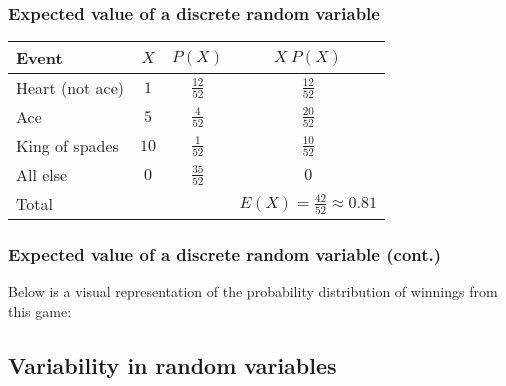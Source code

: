\documentclass[slidestop,compress,mathserif]{beamer}
\begin{document}

\begin{frame}
\frametitle{Expected value of a discrete random variable}


\pause

\begin{center}
\renewcommand{\arraystretch}{1.5}
\begin{tabular}{l | c | c | c }
Event		& $X$ 		& $P(X)$        		& $X ~ P(X)$ \\
\hline
Heart (not ace)	& $1$		& $\frac{12}{52}$	& $\frac{12}{52}$ \\
Ace			& $5$		& $\frac{4}{52}$	& $\frac{20}{52}$ \\	
King of spades	& $10$		& $\frac{1}{52}$	& $\frac{10}{52}$ \\	
All else		& $0$		& $\frac{35}{52}$	& $0$ \\
\hline
Total			&			&				& $E(X) = \frac{42}{52} \approx 0.81$
\end{tabular}

\end{center}

\end{frame}


\begin{frame}
\frametitle{Expected value of a discrete random variable (cont.)}

Below is a visual representation of the probability distribution of winnings from this game:

\begin{center}
\end{center}

\end{frame}


\subsection{Variability in random variables}
\end{document}
